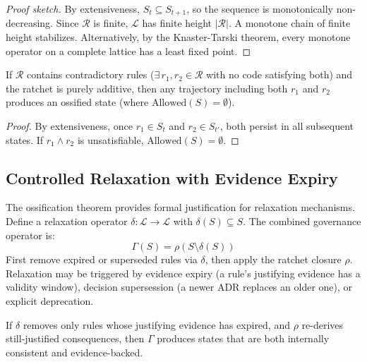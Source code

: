 \begin{proof}[Proof sketch]
By extensiveness, $S_t \subseteq S_{t+1}$, so the sequence is monotonically non-decreasing. Since $\mathcal{R}$ is finite, $\mathcal{L}$ has finite height $|\mathcal{R}|$. A monotone chain of finite height stabilizes. Alternatively, by the Knaster-Tarski theorem, every monotone operator on a complete lattice has a least fixed point.
\end{proof}

\begin{theorem}
\label{thm:ossification}
If $\mathcal{R}$ contains contradictory rules ($\exists\, r_1, r_2 \in \mathcal{R}$ with no code satisfying both) and the ratchet is purely additive, then any trajectory including both $r_1$ and $r_2$ produces an ossified state (where $\mathrm{Allowed}(S) = \emptyset$).
\end{theorem}

\begin{proof}
By extensiveness, once $r_1 \in S_t$ and $r_2 \in S_{t'}$, both persist in all subsequent states. If $r_1 \wedge r_2$ is unsatisfiable, $\mathrm{Allowed}(S) = \emptyset$.
\end{proof}

\subsection{Controlled Relaxation with Evidence Expiry}

The ossification theorem provides formal justification for relaxation mechanisms. Define a relaxation operator $\delta: \mathcal{L} \to \mathcal{L}$ with $\delta(S) \subseteq S$. The combined governance operator is:
\begin{equation}
    \Gamma(S) = \rho(S \setminus \delta(S))
\end{equation}
First remove expired or superseded rules via $\delta$, then apply the ratchet closure $\rho$. Relaxation may be triggered by evidence expiry (a rule's justifying evidence has a validity window), decision supersession (a newer ADR replaces an older one), or explicit deprecation.

\begin{theorem}
If $\delta$ removes only rules whose justifying evidence has expired, and $\rho$ re-derives still-justified consequences, then $\Gamma$ produces states that are both internally consistent and evidence-backed.
\end{theorem}

